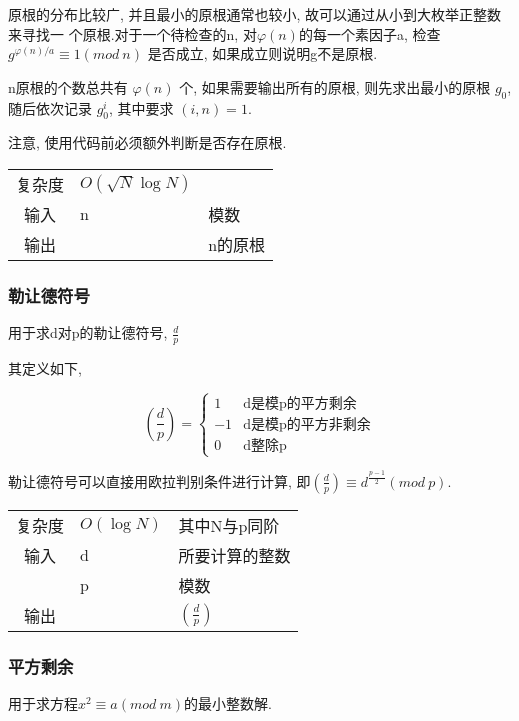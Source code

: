 原根的分布比较广, 并且最小的原根通常也较小, 故可以通过从小到大枚举正整数来寻找一
个原根.对于一个待检查的n, 对$\varphi(n)$的每一个素因子a, 检查$g^{\varphi(n)/a} \equiv 1(mod\ n)$
是否成立, 如果成立则说明g不是原根.

n原根的个数总共有 $\varphi(n)$ 个, 如果需要输出所有的原根, 则先求出最小的原根 $g_0$, 随后依次记录 $g_0^i$, 其中要求 $(i, n) = 1$.

注意, 使用代码前必须额外判断是否存在原根.
\begin{longtable}{|c|l|l|}
复杂度 & $O(\sqrt{N}\log N)$ & \\
输入 & n & 模数 \\
输出 &  & n的原根 \\
\end{longtable}



        \subsubsection{勒让德符号}\small
用于求d对p的勒让德符号, $\frac{d}{p}$

其定义如下, 

\[ (\frac{d}{p}) = 
\begin{cases}
 1 & \text{d是模p的平方剩余} \\
 -1 & \text{d是模p的平方非剩余} \\
 0 & \text{d整除p}
\end{cases} \]

勒让德符号可以直接用欧拉判别条件进行计算, 即$(\frac{d}{p}) \equiv d ^ {\frac{p-1}{2}}(mod\ p)$.

\begin{longtable}{|c|l|l|}
复杂度 & $O(\log N)$ & 其中N与p同阶  \\
输入 & d & 所要计算的整数 \\
 & p & 模数 \\
输出 &  & $(\frac{d}{p})$ \\
\end{longtable}



        \subsubsection{平方剩余}\small
用于求方程$x^{2} \equiv a(mod\ m)$的最小整数解.

